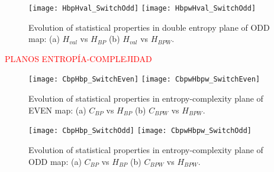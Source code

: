 \begin{figure}
	\texttt{[image: HbpHval\_SwitchOdd]}
	\texttt{[image: HbpwHval\_SwitchOdd]}
	\caption{Evolution of statistical properties in double entropy plane of ODD map: (a) $H_{val}$ vs $H_{BP}$ (b) $H_{val}$ vs $H_{BPW}$.}
	\label{fig:ODD_HH}
\end{figure}

\textcolor{red}{PLANOS ENTROPÍA-COMPLEJIDAD}

\begin{figure}
	\texttt{[image: CbpHbp\_SwitchEven]}
	\texttt{[image: CbpwHbpw\_SwitchEven]}
	\caption{Evolution of statistical properties in entropy-complexity plane of EVEN map: (a) $C_{BP}$ vs $H_{BP}$ (b) $C_{BPW}$ vs $H_{BPW}$.}
	\label{fig:EVEN_HC}
\end{figure}

\begin{figure}
	\texttt{[image: CbpHbp\_SwitchOdd]}
	\texttt{[image: CbpwHbpw\_SwitchOdd]}
	\caption{Evolution of statistical properties in entropy-complexity plane of ODD map: (a) $C_{BP}$ vs $H_{BP}$ (b) $C_{BPW}$ vs $H_{BPW}$.}
	\label{fig:ODD_HC}
\end{figure}